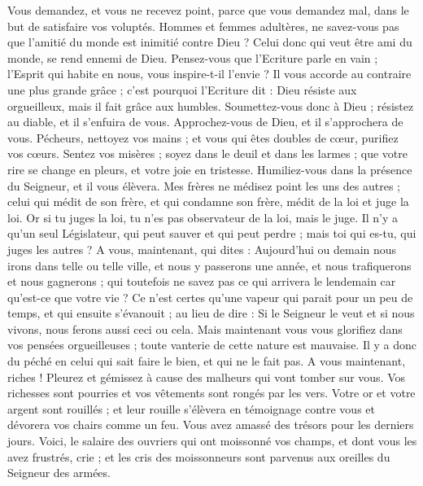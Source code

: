 \begin{multicols}{2}
Vous demandez, et vous ne recevez point, parce que vous demandez mal, dans le but de satisfaire vos voluptés.
Hommes et femmes adultères, ne savez-vous pas que l'amitié du monde est inimitié contre Dieu ? Celui donc qui veut être ami du monde, se rend ennemi de Dieu.
Pensez-vous que l'Ecriture parle en vain ; l’Esprit qui habite en nous, vous inspire-t-il l’envie ?
Il vous accorde au contraire une plus grande grâce ; c’est pourquoi l’Ecriture dit : Dieu résiste aux orgueilleux, mais il fait grâce aux humbles.
Soumettez-vous donc à Dieu ; résistez au diable, et il s'enfuira de vous.
Approchez-vous de Dieu, et il s'approchera de vous. Pécheurs, nettoyez vos mains ; et vous qui êtes doubles de cœur, purifiez vos cœurs.
Sentez vos misères ; soyez dans le deuil et dans les larmes ; que votre rire se change en pleurs, et votre joie en tristesse.
Humiliez-vous dans la présence du Seigneur, et il vous élèvera.
Mes frères ne médisez point les uns des autres ; celui qui médit de son frère, et qui condamne son frère, médit de la loi et juge la loi. Or si tu juges la loi, tu n'es pas observateur de la loi, mais le juge.
Il n'y a qu'un seul Législateur, qui peut sauver et qui peut perdre ; mais toi qui es-tu, qui juges les autres ?
A vous, maintenant, qui dites : Aujourd’hui ou demain nous irons dans telle ou telle ville, et nous y passerons une année, et nous trafiquerons et nous gagnerons ;
qui toutefois ne savez pas ce qui arrivera le lendemain car qu’est-ce que votre vie ? Ce n’est certes qu’une vapeur qui parait pour un peu de temps, et qui ensuite s’évanouit ;
au lieu de dire : Si le Seigneur le veut et si nous vivons, nous ferons aussi ceci ou cela.
Mais maintenant vous vous glorifiez dans vos pensées orgueilleuses ; toute vanterie de cette nature est mauvaise.
Il y a donc du péché en celui qui sait faire le bien, et qui ne le fait pas.
\VerseOne{}A vous maintenant, riches ! Pleurez et gémissez à cause des malheurs qui vont tomber sur vous.
Vos richesses sont pourries et vos vêtements sont rongés par les vers.
Votre or et votre argent sont rouillés ; et leur rouille s’élèvera en témoignage contre vous et dévorera vos chairs comme un feu. Vous avez amassé des trésors pour les derniers jours.
Voici, le salaire des ouvriers qui ont moissonné vos champs, et dont vous les avez frustrés, crie ; et les cris des moissonneurs sont parvenus aux oreilles du Seigneur des armées.

\end{multicols}
